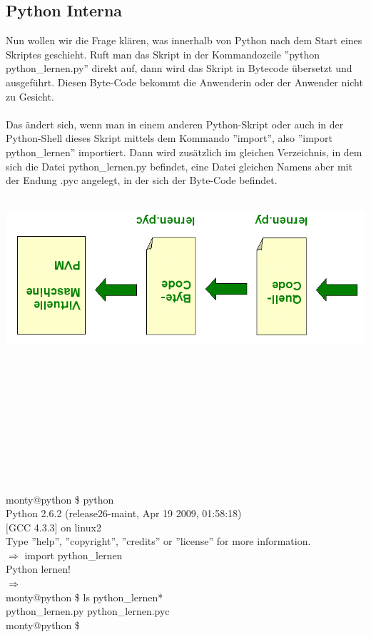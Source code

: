 \subsection{Python Interna}
Nun wollen wir die Frage klären, was innerhalb von Python nach dem Start eines Skriptes geschieht. Ruft man das Skript in der Kommandozeile ''python python\_lernen.py'' direkt auf, dann wird das Skript in Bytecode übersetzt und ausgeführt. Diesen Byte-Code bekommt die Anwenderin oder der Anwender nicht zu Gesicht.\\
\\
Das ändert sich, wenn man in einem anderen Python-Skript oder auch in der Python-Shell dieses Skript mittels dem Kommando ''import'', also ''import python\_lernen'' importiert. Dann wird zusätzlich im gleichen Verzeichnis, in dem sich die Datei python\_lernen.py befindet, eine Datei gleichen Namens aber mit der Endung .pyc angelegt, in der sich der Byte-Code befindet.\\
\\
\begin{minipage}{-0.8\textwidth}
\centering
\includegraphics[width=0.7\linewidth]{pics/byte_code.png}
\label{fig:byte_code}
\end{minipage}
\\ \\ \\ \\
\\ \\ \\
\\ \\
\begin{MyConsoleBox}{
monty@python \$ python \\
Python 2.6.2 (release26-maint, Apr 19 2009, 01:58:18) \\
$[$GCC 4.3.3$]$ on linux2 \\
Type ''help'', ''copyright'', ''credits'' or ''license'' for more information. \\
${\Longrightarrow}$ import python\_lernen \\
Python lernen! \\
${\Longrightarrow}$ \\
monty@python \$ ls python\_lernen* \\
python\_lernen.py   python\_lernen.pyc \\
monty@python \$ 
}\end{MyConsoleBox}

